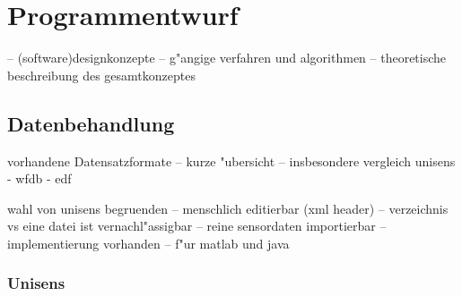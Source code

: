 \chapter{Programmentwurf}

-- (software)designkonzepte
-- g"angige verfahren und algorithmen
-- theoretische beschreibung des gesamtkonzeptes

\section{Datenbehandlung}

vorhandene Datensatzformate
	-- kurze "ubersicht
	-- insbesondere vergleich unisens - wfdb - edf

wahl von unisens begruenden
	-- menschlich editierbar (xml header)
	-- verzeichnis vs eine datei ist vernachl"assigbar
	-- reine sensordaten importierbar
	-- implementierung vorhanden
	-- f"ur matlab und java

\subsection{Unisens}

